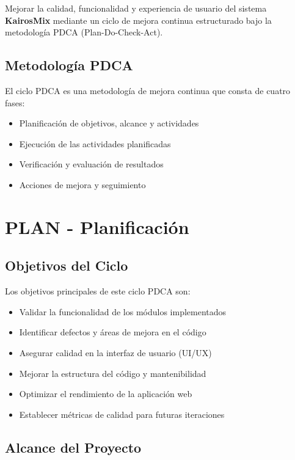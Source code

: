 \documentclass[12pt,a4paper]{report}
\begin{document}
Mejorar la calidad, funcionalidad y experiencia de usuario del sistema \textcolor{cafeOscuro}{\textbf{KairosMix}} mediante un ciclo de mejora continua estructurado bajo la metodología PDCA (Plan-Do-Check-Act).

\section{Metodología PDCA}

El ciclo PDCA es una metodología de mejora continua que consta de cuatro fases:

\begin{itemize}
    \item[\textcolor{cafeOscuro}{\textbf{Plan}}] Planificación de objetivos, alcance y actividades
    \item[\textcolor{verde}{\textbf{Do}}] Ejecución de las actividades planificadas
    \item[\textcolor{azulOscuro}{\textbf{Check}}] Verificación y evaluación de resultados
    \item[\textcolor{cafeOscuro}{\textbf{Act}}] Acciones de mejora y seguimiento
\end{itemize}

\chapter{PLAN - Planificación}

\section{Objetivos del Ciclo}

Los objetivos principales de este ciclo PDCA son:

\begin{itemize}
    \item Validar la funcionalidad de los módulos implementados
    \item Identificar defectos y áreas de mejora en el código
    \item Asegurar calidad en la interfaz de usuario (UI/UX)
    \item Mejorar la estructura del código y mantenibilidad
    \item Optimizar el rendimiento de la aplicación web
    \item Establecer métricas de calidad para futuras iteraciones
\end{itemize}

\section{Alcance del Proyecto}
\end{document}

